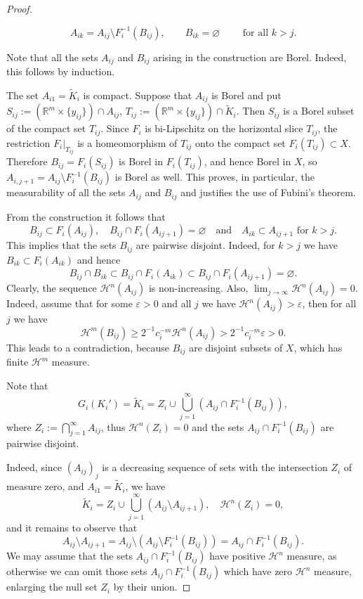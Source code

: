 \documentclass[12pt,leqno]{amsart}
\theoremstyle{definition}
\newcommand{\bbbr}{\mathbb R}
\newcommand{\eps}{\varepsilon}
\def\H{{\mathcal H}}
\numberwithin{theorem}{section} \numberwithin{equation}{section}
\begin{document}
\begin{proof}
\begin{itemize}
  $$
  A_{ik}=A_{ij}\setminus F_i^{-1}(B_{ij}), \qquad B_{ik}=\varnothing \qquad \text{ for all }k>j. $$
\end{itemize}

Note that all the sets $A_{ij}$ and $B_{ij}$ arising in the construction are Borel. Indeed, this follows by induction. 

The set $A_{i1}=\tilde K_i$ is compact. Suppose that $A_{ij}$ is Borel and put $S_{ij}:=(\bbbr^m\times\{y_{ij}\})\cap A_{ij}$, $T_{ij}:=(\bbbr^m\times\{y_{ij}\})\cap \tilde K_i$. Then $S_{ij}$ is a Borel subset of the compact set $T_{ij}$. Since $F_i$ is bi-Lipschitz on the horizontal slice $T_{ij}$, the restriction $F_i|_{T_{ij}}$ is a homeomorphism of $T_{ij}$ onto the compact set $F_i(T_{ij})\subset X$. Therefore $B_{ij}=F_i(S_{ij})$
is Borel in $F_i(T_{ij})$, and hence Borel in $X$, so
$A_{i,j+1}=A_{ij}\setminus F_i^{-1}(B_{ij})$
is Borel as well. This proves, in particular, the measurability of all the sets $A_{ij}$ and $B_{ij}$ and justifies the use of Fubini's theorem.


From the construction it follows that
$$
B_{ij}\subset F_i(A_{ij}),
\quad
B_{ij}\cap F_i(A_{ij+1})=\varnothing
\quad
\text{and}
\quad
A_{ik}\subset A_{ij+1}
\text{ for } k>j.
$$
This implies that the sets $B_{ij}$ are pairwise disjoint. Indeed, for $k>j$ we have $B_{ik}\subset F_i(A_{ik})$ and hence
$$
B_{ij}\cap B_{ik}\subset B_{ij}\cap F_i(A_{ik})\subset B_{ij}\cap F_i(A_{ij+1})=\varnothing.
$$
Clearly, the sequence $\H^n(A_{ij})$ is non-increasing. Also,
$\lim_{j\to\infty}\H^n(A_{ij})=0$. Indeed, assume that for some $\eps>0$ and all $j$ we have $\H^n(A_{ij})>\eps$, then for all $j$ we have
$$
\H^m(B_{ij})\geq 2^{-1}c_i^{-m}\H^n(A_{ij})>2^{-1}c_i^{-m}\eps>0.
$$
This leads to a contradiction, because $B_{ij}$ are disjoint subsets of $X$, which has finite $\H^m$ measure.

Note that
\begin{equation}
\label{Ieq1}
G_i(K_i')=\tilde{K}_i=Z_i\cup\bigcup_{j=1}^\infty(A_{ij}\cap F_i^{-1}(B_{ij})),
\end{equation}
where $Z_i:=\bigcap_{j=1}^\infty A_{ij}$, thus  $\H^n(Z_i)=0$ and the sets $A_{ij}\cap F_i^{-1}(B_{ij})$ are pairwise disjoint.

Indeed, since $(A_{ij})_j$ is a decreasing sequence of sets with the intersection $Z_i$ of measure zero,
and $A_{i1}=\tilde{K}_i$, we have
$$
\tilde{K}_i=Z_i\cup\bigcup_{j=1}^\infty(A_{ij}\setminus A_{ij+1}),
\quad
\H^n(Z_i)=0,
$$
and it remains to observe that
$$
A_{ij}\setminus A_{ij+1}=A_{ij}\setminus(A_{ij}\setminus F_i^{-1}(B_{ij}))=A_{ij}\cap F_i^{-1}(B_{ij}).
$$
We may assume that the sets $A_{ij}\cap F_i^{-1}(B_{ij})$ have positive $\H^n$ measure, as otherwise we can omit those sets $A_{ij}\cap F_i^{-1}(B_{ij})$ which have zero $\H^n$ measure, enlarging the null set $Z_i$ by their union.


\end{proof}
\end{document}
